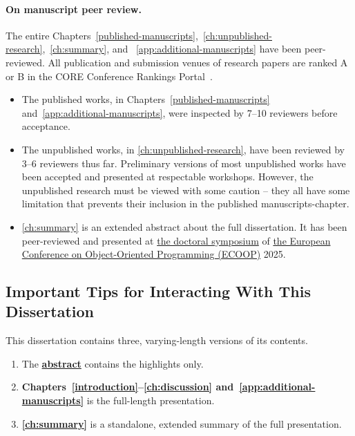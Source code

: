 \paragraph*{On manuscript peer review.}
The entire Chapters~\ref{published-manuscripts},~\ref{ch:unpublished-research},~\ref{ch:summary}, and ~\ref{app:additional-manuscripts} have been peer-reviewed.
All publication and submission venues of research papers are ranked A or B in the CORE Conference Rankings Portal~\cite{core}.
\begin{itemize}
\item The published works, in Chapters~\ref{published-manuscripts} and~\ref{app:additional-manuscripts}, were inspected by 7--10 reviewers before acceptance.
\item The unpublished works, in \autoref{ch:unpublished-research}, have been reviewed by 3--6 reviewers thus far.
Preliminary versions of most unpublished works have been accepted and presented at respectable workshops.
However, the unpublished research must be viewed with some caution -- they all have some limitation that prevents their inclusion in the {published} manuscripts-chapter.
\item \autoref{ch:summary} is an extended abstract about the full dissertation.
It has been peer-reviewed and presented at \href{https://2025.ecoop.org/track/ecoop-2025-doctoral-symposium}{the doctoral symposium}
of \href{https://2025.ecoop.org}{the European Conference on Object-Oriented Programming (ECOOP)} 2025.
\end{itemize}


\subsection{Important Tips for Interacting With This Dissertation}
\label{subsec:tips}

This dissertation contains three, varying-length versions of its contents.

\begin{mdframed}[backgroundcolor=paperbase,linecolor=paper]
\begin{enumerate}[wide, labelwidth=!, labelindent=0pt]
\item The \textbf{\hyperref[abs]{abstract}} contains the highlights only.
\item \textbf{Chapters~\ref{introduction}--\ref{ch:discussion} and~\ref{app:additional-manuscripts}} is the full-length presentation.
\item \textbf{\autoref{ch:summary}} is a standalone, extended summary of the full presentation.
\end{enumerate}
\end{mdframed}

